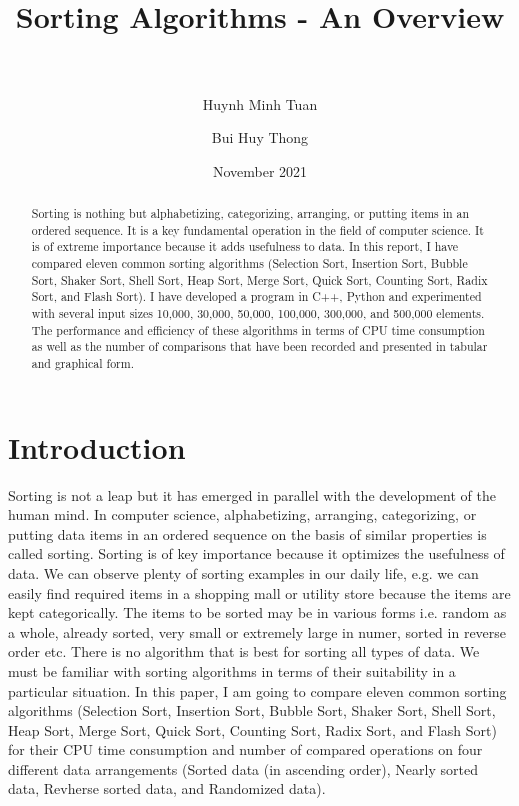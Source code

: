 \documentclass[11pt,a4paper]{article}
\title{
\normalfont \LARGE
\horrule{1pt} \\[0.4cm] %
\huge Sorting Algorithms - An Overview \\ %
\horrule{1pt} \\[0.6cm] %
}
\author[1]{Huynh Minh Tuan}
\author[2]{Bui Huy Thong}
\affil[1,2]{Ho Chi Minh University of Science}
\date{November 2021}
\newcommand\tab[1][1cm]{\hspace*{#1}}
\begin{document}
\maketitle

\begin{abstract}
    Sorting is nothing but alphabetizing, categorizing, arranging, or putting items in an ordered sequence. 
    It is a key fundamental operation in the field of computer science. It is of extreme importance because it adds usefulness to data.
    In this report, I have compared eleven common sorting algorithms (Selection Sort, Insertion Sort, Bubble Sort, Shaker Sort, Shell Sort, Heap
    Sort, Merge Sort, Quick Sort, Counting Sort, Radix Sort, and Flash Sort). I have developed a program in C++, Python and experimented with several input sizes
    10,000, 30,000, 50,000, 100,000, 300,000, and 500,000 elements. The performance and efficiency of these algorithms in terms of CPU time consumption 
    as well as the number of comparisons that have been recorded and presented in tabular and graphical form.
\end{abstract}

\section{Introduction}
\tab Sorting is not a leap but it has emerged in parallel with the development of the human mind.
In computer science, alphabetizing, arranging, categorizing, or putting data items in an ordered sequence on the basis of similar properties is called sorting.
Sorting is of key importance because it optimizes the usefulness of data.
We can observe plenty of sorting examples in our daily life, e.g. we can easily find required items in a shopping mall or utility store because the items are kept categorically.
\newline
\newline
\tab The items to be sorted may be in various forms i.e. random as a whole, already sorted, very small or extremely large in numer, sorted in reverse order etc.
There is no algorithm that is best for sorting all types of data. 
We must be familiar with sorting algorithms in terms of their suitability in a particular situation.
\newline
\newline
\tab In this paper, I am going to compare eleven common sorting algorithms (Selection Sort, Insertion Sort, Bubble Sort, Shaker Sort, Shell Sort, Heap
Sort, Merge Sort, Quick Sort, Counting Sort, Radix Sort, and Flash Sort) for their CPU time consumption and number of compared operations on four different data arrangements 
(Sorted data (in ascending order), Nearly sorted data, Revherse sorted data, and Randomized data).
\end{document}
